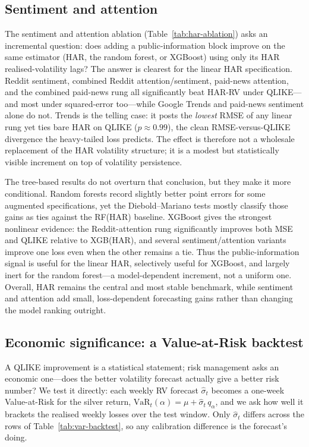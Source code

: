 \documentclass[12pt, a4paper]{article}
\begin{document}
\subsection{Sentiment and attention}
\label{sec:var-sentiment}

The sentiment and attention ablation (Table~\ref{tab:har-ablation}) asks an incremental
question: does adding a public-information block improve on the same estimator (HAR, the random
forest, or XGBoost) using only its HAR realised-volatility lags? The answer is clearest for the linear HAR
specification. Reddit sentiment, combined Reddit
attention/sentiment, paid-news attention, and the combined paid-news rung all
significantly beat HAR-RV under QLIKE---and most under squared-error too---while Google Trends
and paid-news sentiment alone do not. Trends is the telling case: it posts the
\emph{lowest} RMSE of any linear rung yet ties bare HAR on QLIKE
(\(p\approx0.99\)), the clean RMSE-versus-QLIKE divergence the heavy-tailed loss predicts. The effect is therefore not a wholesale replacement of the
HAR volatility structure; it is a modest but statistically visible increment on top of
volatility persistence.

The tree-based results do not overturn that conclusion, but they make it more
conditional. Random forests record slightly better point errors for some augmented
specifications, yet the Diebold--Mariano tests mostly classify those gains as ties
against the RF(HAR) baseline. XGBoost gives the strongest nonlinear evidence:
the Reddit-attention rung significantly improves both MSE and QLIKE relative to
XGB(HAR), and several sentiment/attention variants improve one loss even when the
other remains a tie. Thus the public-information signal is useful for the linear HAR,
selectively useful for XGBoost, and largely inert for the random forest---a model-dependent
increment, not a uniform one. Overall, HAR remains the central and
most stable benchmark, while sentiment and attention add small, loss-dependent
forecasting gains rather than changing the model ranking outright.

\subsection{Economic significance: a Value-at-Risk backtest}
\label{sec:var-backtest}

A QLIKE improvement is a statistical statement; risk management asks an economic one---does the
better volatility forecast actually give a better risk number? We test it directly: each weekly RV
forecast \(\hat\sigma_t\) becomes a one-week Value-at-Risk for the silver return,
\(\mathrm{VaR}_t(\alpha) = \mu + \hat\sigma_t\, q_\alpha\), and we ask how well it brackets the
realised weekly losses over the test window. Only \(\hat\sigma_t\) differs across the rows of
Table~\ref{tab:var-backtest}, so any calibration difference is the forecast's doing.
\end{document}
